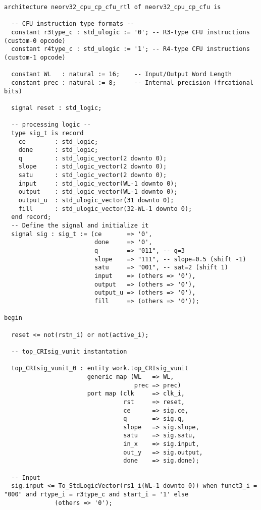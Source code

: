 \begin{code}
\begin{verbatim}
architecture neorv32_cpu_cp_cfu_rtl of neorv32_cpu_cp_cfu is

  -- CFU instruction type formats --
  constant r3type_c : std_ulogic := '0'; -- R3-type CFU instructions (custom-0 opcode)
  constant r4type_c : std_ulogic := '1'; -- R4-type CFU instructions (custom-1 opcode)

  constant WL   : natural := 16;    -- Input/Output Word Length 
  constant prec : natural := 8;     -- Internal precision (frcational bits)

  signal reset : std_logic;

  -- processing logic --
  type sig_t is record
    ce        : std_logic;
    done      : std_logic;
    q         : std_logic_vector(2 downto 0); 
    slope     : std_logic_vector(2 downto 0); 
    satu      : std_logic_vector(2 downto 0); 
    input     : std_logic_vector(WL-1 downto 0);
    output    : std_logic_vector(WL-1 downto 0);
    output_u  : std_ulogic_vector(31 downto 0);
    fill      : std_ulogic_vector(32-WL-1 downto 0);
  end record;
  -- Define the signal and initialize it
  signal sig : sig_t := (ce       => '0',
                         done     => '0',
                         q        => "011", -- q=3
                         slope    => "111", -- slope=0.5 (shift -1)
                         satu     => "001", -- sat=2 (shift 1)
                         input    => (others => '0'),
                         output   => (others => '0'),
                         output_u => (others => '0'),
                         fill     => (others => '0'));

begin

  reset <= not(rstn_i) or not(active_i);

  -- top_CRIsig_vunit instantation

  top_CRIsig_vunit_0 : entity work.top_CRIsig_vunit
                       generic map (WL   => WL,
                                    prec => prec)
                       port map (clk     => clk_i,
                                 rst     => reset,
                                 ce      => sig.ce,
                                 q       => sig.q,
                                 slope   => sig.slope,
                                 satu    => sig.satu,
                                 in_x    => sig.input,
                                 out_y   => sig.output,
                                 done    => sig.done);

  -- Input
  sig.input <= To_StdLogicVector(rs1_i(WL-1 downto 0)) when funct3_i = "000" and rtype_i = r3type_c and start_i = '1' else
              (others => '0');


\end{verbatim}
\end{code}
